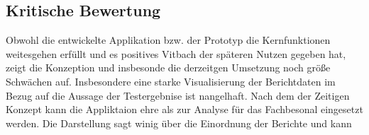 \subsection{Kritische Bewertung}
\label{subsec:kritische-bewertung}

Obwohl die entwickelte Applikation bzw. der Prototyp die Kernfunktionen weitesgehen erfüllt und es positives Vitbach der späteren Nutzen gegeben hat,
zeigt die Konzeption und insbesonde die derzeitgen Umsetzung noch größe Schwächen auf.
Insbesondere eine starke Visualisierung der Berichtdaten im Bezug auf die Aussage der Testergebnise ist nangelhaft.
Nach dem der Zeitigen Konzept kann die Appliktaion ehre als zur Analyse für das Fachbesonal eingesetzt werden. Die Darstellung
sagt winig über die Einordnung der Berichte und  kann
